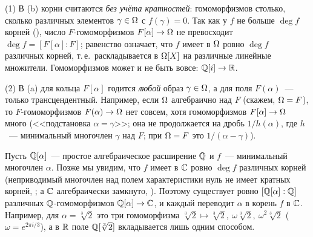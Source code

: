 \begin{remark}[2.1a]
(1) В (b) корни считаются \emph{без учёта кратностей}: гомоморфизмов столько, сколько различных элементов
$\gamma\in\Omega$ с $f(\gamma)=0$. Так как у $f$ не больше $\deg f$ корней (), число $F$-гомоморфизмов $F[\alpha]\to\Omega$
не превосходит $\deg f=[F[\alpha]:F]$; равенство означает, что $f$ имеет в $\Omega$ ровно $\deg f$ различных корней, т.\,е.\
раскладывается в $\Omega[X]$ на различные линейные множители. Гомоморфизмов может и не быть вовсе: $\mathbb Q[i]\to\mathbb R$.

(2) В (a) для кольца $F[\alpha]$ годится \emph{любой} образ $\gamma\in\Omega$, а для поля $F(\alpha)$~--- только
трансцендентный. Например, если $\Omega$ алгебраично над $F$ (скажем, $\Omega=F$), то $F$-гомоморфизмов $F(\alpha)\to\Omega$ нет
совсем, хотя гомоморфизмов $F[\alpha]\to\Omega$ много (<<подстановка $\alpha=\gamma$>>; она не продолжается на дробь
$1/h(\alpha)$, где $h$~--- минимальный многочлен $\gamma$ над $F$; при $\Omega=F$ это $1/(\alpha-\gamma)$).
\end{remark}

\begin{example}[2.2]
Пусть $\mathbb Q[\alpha]$~--- простое алгебраическое расширение $\mathbb Q$ и $f$~--- минимальный многочлен $\alpha$. Позже мы увидим,
что $f$ имеет в $\mathbb C$ ровно $\deg f$ различных корней (неприводимый многочлен над полем характеристики нуль не имеет
кратных корней, \rf{2.20}; а $\mathbb C$ алгебраически замкнуто, \rf{5.6}). Поэтому существует ровно $[\mathbb Q[\alpha]:\mathbb Q]$
различных $\mathbb Q$-гомоморфизмов $\mathbb Q[\alpha]\to\mathbb C$, и каждый переводит $\alpha$ в корень $f$ в $\mathbb C$. Например, для
$\alpha=\sqrt[3]2$ это три гомоморфизма $\sqrt[3]2\mapsto\sqrt[3]2,\ \omega\sqrt[3]2,\ \omega^2\sqrt[3]2$
($\omega=e^{2\pi i/3}$), а в $\mathbb R$ поле $\mathbb Q[\sqrt[3]2]$ вкладывается лишь одним способом.
\end{example}

